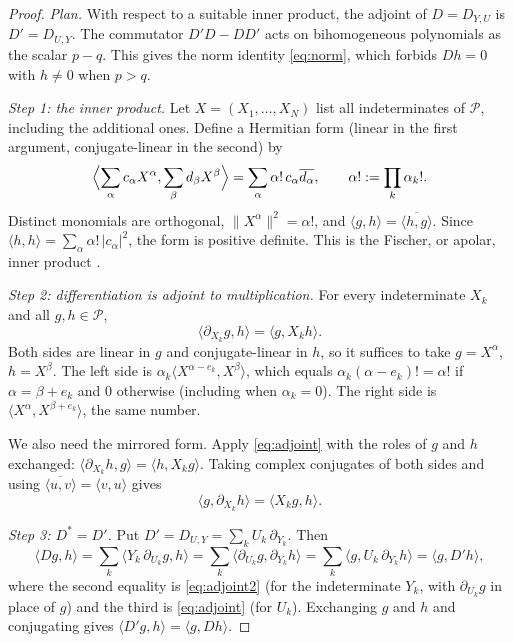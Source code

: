 \documentclass[11pt]{article}
\theoremstyle{remark}
\newcommand{\D}[2]{D_{#1,#2}}
\newcommand{\PP}{\mathcal P}
\begin{document}
\begin{proof}
\emph{Plan.} With respect to a suitable inner product, the adjoint of
$D=\D{Y}{U}$ is $D'=\D{U}{Y}$. The commutator $D'D-DD'$ acts on
bihomogeneous polynomials as the scalar $p-q$. This gives the norm identity
\eqref{eq:norm}, which forbids $Dh=0$ with $h\ne0$ when $p>q$.

\emph{Step 1: the inner product.} Let $X=(X_1,\dots,X_N)$ list all
indeterminates of $\PP$, including the additional ones. Define a Hermitian
form (linear in the first argument, conjugate-linear in the second) by
\begin{equation}\label{eq:fischer}
 \Bigl\langle\sum_\alpha c_\alpha X^\alpha,\sum_\beta d_\beta X^\beta
 \Bigr\rangle=\sum_\alpha\alpha!\,c_\alpha\overline{d_\alpha},
 \qquad\alpha!:=\prod_k\alpha_k!.
\end{equation}
Distinct monomials are orthogonal, $\|X^\alpha\|^2=\alpha!$, and
$\langle g,h\rangle=\overline{\langle h,g\rangle}$. Since
$\langle h,h\rangle=\sum_\alpha\alpha!\,|c_\alpha|^2$, the form is positive
definite. This is the Fischer, or apolar, inner product
\cite[Section~2, equation~(8) and Proposition~3]{AldazRender}.

\emph{Step 2: differentiation is adjoint to multiplication.} For every
indeterminate $X_k$ and all $g,h\in\PP$,
\begin{equation}\label{eq:adjoint}
 \langle\partial_{X_k}g,h\rangle=\langle g,X_kh\rangle .
\end{equation}
Both sides are linear in $g$ and conjugate-linear in $h$, so it suffices to
take $g=X^\alpha$, $h=X^\beta$. The left side is
$\alpha_k\langle X^{\alpha-e_k},X^\beta\rangle$, which equals
$\alpha_k(\alpha-e_k)!=\alpha!$ if $\alpha=\beta+e_k$ and $0$ otherwise
(including when $\alpha_k=0$). The right side is
$\langle X^\alpha,X^{\beta+e_k}\rangle$, the same number.

We also need the mirrored form. Apply \eqref{eq:adjoint} with the roles of
$g$ and $h$ exchanged: $\langle\partial_{X_k}h,g\rangle=\langle
h,X_kg\rangle$. Taking complex conjugates of both sides and using
$\overline{\langle u,v\rangle}=\langle v,u\rangle$ gives
\begin{equation}\label{eq:adjoint2}
 \langle g,\partial_{X_k}h\rangle=\langle X_kg,h\rangle .
\end{equation}

\emph{Step 3: $D^*=D'$.} Put $D'=\D{U}{Y}=\sum_kU_k\,\partial_{Y_k}$.
Then
\[
 \langle Dg,h\rangle
 =\sum_k\langle Y_k\,\partial_{U_k}g,h\rangle
 =\sum_k\langle\partial_{U_k}g,\partial_{Y_k}h\rangle
 =\sum_k\langle g,U_k\,\partial_{Y_k}h\rangle
 =\langle g,D'h\rangle,
\]
where the second equality is \eqref{eq:adjoint2} (for the indeterminate
$Y_k$, with $\partial_{U_k}g$ in place of $g$) and the third is
\eqref{eq:adjoint} (for $U_k$). Exchanging $g$ and $h$ and conjugating
gives $\langle D'g,h\rangle=\langle g,Dh\rangle$.


\end{proof}
\end{document}
